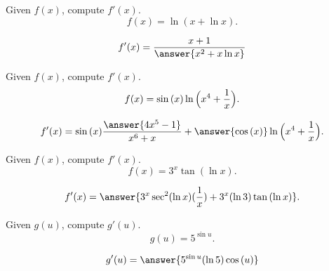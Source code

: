 \documentclass{ximera}
\author{Nela Lakos}
\begin{document}
\begin{exercise}
Given $f(x)$, compute $f'(x)$.
\[
f(x) = \ln{(x+\ln{x})}.
\]
\begin{prompt}
\[
f'(x) =\dfrac{x+1}{ \answer{x^2 +x\ln{x}}}
\]
\end{prompt}
\end{exercise}
\begin{exercise}
Given $f(x)$, compute $f'(x)$.
\[
f(x) = \sin{(x)}\ln{\Bigl(x^4+\frac{1}{x}\Bigr)}.
\]
\begin{prompt}
\[
f'(x) = \sin{(x)}\frac{\answer{4x^5-1}}{{x^6+x}}+\answer{ \cos{(x)}}\ln{\Bigl(x^4+\frac{1}{x}\Bigr)}.
\]
\end{prompt}
\end{exercise}
\begin{exercise}
Given $f(x)$, compute $f'(x)$.
\[
f(x) = 3^{x}\tan{(\ln{x})}.
\]
\begin{prompt}
\[
f'(x) =\answer{3^{x}\sec^2(\ln{x})(\frac{1}{x})+3^x(\ln{3})\tan{(\ln{x})}}.
\]
\end{prompt}
\end{exercise}

\begin{exercise}
Given $g(u)$, compute $g'(u)$.
\[
g(u) =5^{\sin{u}}.
\]
\begin{prompt}
\[
g'(u) =\answer{ 5^{\sin{u}}(\ln{5})\cos{(u)}}
\]
\end{prompt}
\end{exercise}
\end{document}
